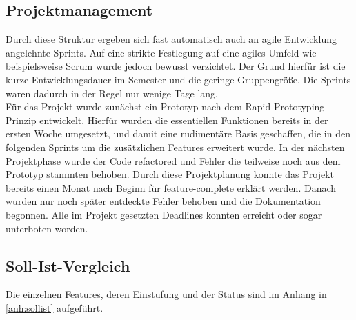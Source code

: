 \subsection*{Projektmanagement}
Durch diese Struktur ergeben sich fast automatisch auch an agile Entwicklung angelehnte Sprints. Auf eine strikte Festlegung auf eine agiles Umfeld wie beispielsweise Scrum wurde jedoch bewusst verzichtet. Der Grund hierfür ist die kurze Entwicklungsdauer im Semester und die geringe Gruppengröße. Die Sprints waren dadurch in der Regel nur wenige Tage lang. \\
Für das Projekt wurde zunächst ein Prototyp nach dem Rapid-Prototyping-Prinzip entwickelt. Hierfür wurden die essentiellen Funktionen bereits in der ersten Woche umgesetzt, und damit eine rudimentäre Basis geschaffen, die in den folgenden Sprints um die zusätzlichen Features erweitert wurde. In der nächsten Projektphase wurde der Code refactored und Fehler die teilweise noch aus dem Prototyp stammten behoben. Durch diese Projektplanung konnte das Projekt bereits einen Monat nach Beginn für feature-complete erklärt werden. Danach wurden nur noch später entdeckte Fehler behoben und die Dokumentation begonnen. Alle im Projekt gesetzten Deadlines konnten erreicht oder sogar unterboten worden.
\subsection*{Soll-Ist-Vergleich}
Die einzelnen Features, deren Einstufung und der Status sind im Anhang in \autoref{anh:sollist} aufgeführt.